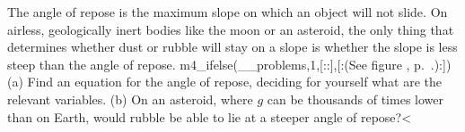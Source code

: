   The angle of repose is the maximum slope on which an
object will not slide. On airless, geologically inert bodies
like the moon or an asteroid, the only thing that determines
whether dust or rubble will stay on a slope is whether the
slope is less steep than the angle of repose.
m4_ifelse(__problems,1,[::],[:(See figure , p.~\pageref{fig:toutatis}.):]) \hwendpart
 (a) Find an
equation for the angle of repose, deciding for yourself what
are the relevant variables.\hwendpart
 (b) On an asteroid, where $g$
can be thousands of times lower than on Earth, would rubble
be able to lie at a steeper angle of repose?<%
